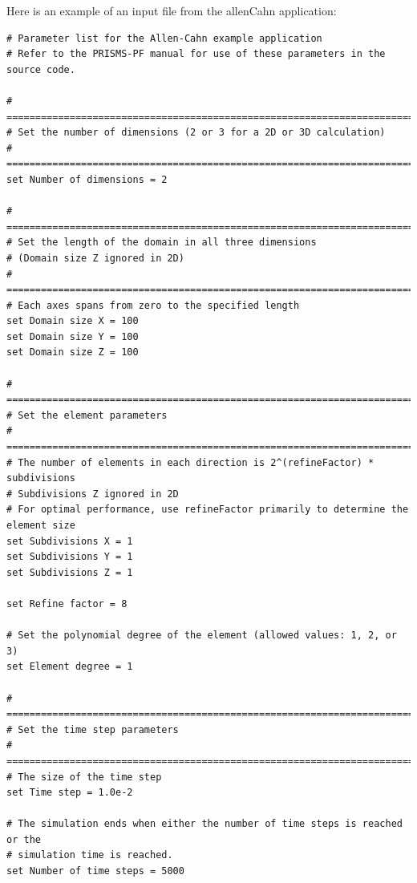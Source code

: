 \documentclass[10pt]{article} %
\begin{document}
Here is an example of an input file from the allenCahn application:
\scriptsize
\begin{lstlisting}
# Parameter list for the Allen-Cahn example application
# Refer to the PRISMS-PF manual for use of these parameters in the source code.

# =================================================================================
# Set the number of dimensions (2 or 3 for a 2D or 3D calculation)
# =================================================================================
set Number of dimensions = 2

# =================================================================================
# Set the length of the domain in all three dimensions
# (Domain size Z ignored in 2D)
# =================================================================================
# Each axes spans from zero to the specified length
set Domain size X = 100
set Domain size Y = 100
set Domain size Z = 100

# =================================================================================
# Set the element parameters
# =================================================================================
# The number of elements in each direction is 2^(refineFactor) * subdivisions
# Subdivisions Z ignored in 2D
# For optimal performance, use refineFactor primarily to determine the element size
set Subdivisions X = 1
set Subdivisions Y = 1
set Subdivisions Z = 1

set Refine factor = 8

# Set the polynomial degree of the element (allowed values: 1, 2, or 3)
set Element degree = 1

# =================================================================================
# Set the time step parameters
# =================================================================================
# The size of the time step
set Time step = 1.0e-2

# The simulation ends when either the number of time steps is reached or the
# simulation time is reached.
set Number of time steps = 5000


\end{lstlisting}
\end{document}
